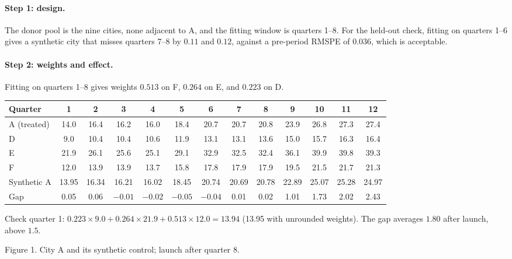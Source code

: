 \documentclass[11pt]{article}
\begin{document}
\paragraph{Step 1: design.} The donor pool is the nine cities, none adjacent to A, and the fitting window is quarters 1--8. For the held-out
check, fitting on quarters 1--6 gives a synthetic city that misses quarters 7--8 by $0.11$ and $0.12$, against a pre-period RMSPE of $0.036$,
which is acceptable.

\paragraph{Step 2: weights and effect.} Fitting on quarters 1--8 gives weights $0.513$ on F, $0.264$ on E, and $0.223$ on D.
\begin{center}
\footnotesize
\setlength{\tabcolsep}{3pt}
\begin{tabular}{lcccccccc|cccc}
\toprule
Quarter & 1 & 2 & 3 & 4 & 5 & 6 & 7 & 8 & 9 & 10 & 11 & 12 \\
\midrule
A (treated) & 14.0 & 16.4 & 16.2 & 16.0 & 18.4 & 20.7 & 20.7 & 20.8 & 23.9 & 26.8 & 27.3 & 27.4 \\
D & 9.0 & 10.4 & 10.4 & 10.6 & 11.9 & 13.1 & 13.1 & 13.6 & 15.0 & 15.7 & 16.3 & 16.4 \\
E & 21.9 & 26.1 & 25.6 & 25.1 & 29.1 & 32.9 & 32.5 & 32.4 & 36.1 & 39.9 & 39.8 & 39.3 \\
F & 12.0 & 13.9 & 13.9 & 13.7 & 15.8 & 17.8 & 17.9 & 17.9 & 19.5 & 21.5 & 21.7 & 21.3 \\
\midrule
Synthetic A & 13.95 & 16.34 & 16.21 & 16.02 & 18.45 & 20.74 & 20.69 & 20.78 & 22.89 & 25.07 & 25.28 & 24.97 \\
Gap & 0.05 & 0.06 & $-0.01$ & $-0.02$ & $-0.05$ & $-0.04$ & 0.01 & 0.02 & 1.01 & 1.73 & 2.02 & 2.43 \\
\bottomrule
\end{tabular}
\end{center}
Check quarter 1: $0.223 \times 9.0 + 0.264 \times 21.9 + 0.513 \times 12.0 = 13.94$ (13.95 with unrounded weights). The gap averages $1.80$ after launch, above $1.5$.

\begin{center}

\small Figure 1. City A and its synthetic control; launch after quarter 8.
\end{center}
\end{document}
